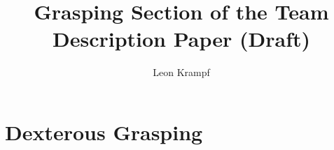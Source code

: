 \documentclass[runningheads,a4paper]{llncs}
\title{Grasping Section of the Team Description Paper (Draft)}
\author{Leon Krampf}
\institute{RoboCup@Home 2027}
\begin{document}
\maketitle
\section{Dexterous Grasping}



\end{document}
